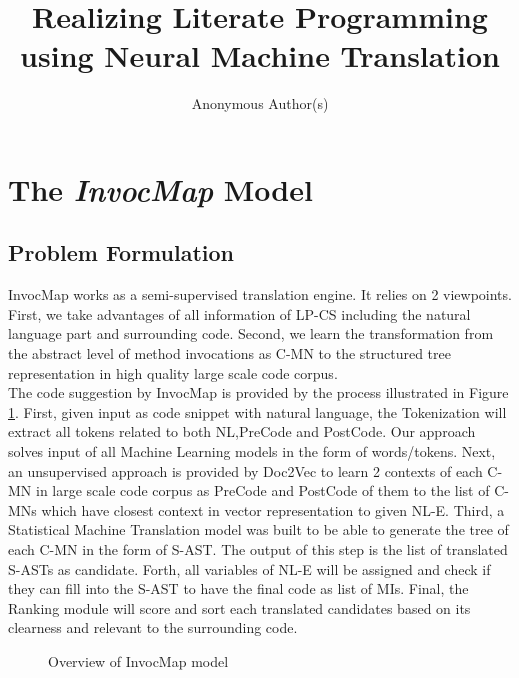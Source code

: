 \documentclass[sigconf,review,anonymous]{article}
\title{Realizing Literate Programming using Neural Machine Translation}
\author{%
  Anonymous Author(s)
}
\begin{document}
\maketitle







\section{The \textit{InvocMap} Model}
\subsection{Problem Formulation}
InvocMap works as a semi-supervised translation engine. It relies on 2 viewpoints. First, we take advantages of all information of LP-CS including the natural language part and surrounding code. Second, we learn the transformation from the abstract level of method invocations as C-MN to the structured tree representation in high quality large scale code corpus. 
\\
The code suggestion by InvocMap is provided by the process illustrated in Figure \ref{figOverview}. First, given input as code snippet with natural language, the Tokenization will extract all tokens related to both NL,PreCode and PostCode. Our approach solves input of all Machine Learning models in the form of words/tokens. Next, an unsupervised approach is provided by Doc2Vec \cite{002} to learn 2 contexts of each C-MN in large scale code corpus as PreCode and PostCode of them to the list of C-MNs which have closest context in vector representation to given NL-E. Third, a Statistical Machine Translation model was built to be able to generate the tree of each C-MN in the form of S-AST. The output of this step is the list of translated S-ASTs as candidate. Forth, all variables of NL-E will be assigned and check if they can fill into the S-AST to have the final code as list of MIs. Final, the Ranking module will score and sort each translated candidates based on its clearness and relevant to the surrounding code.  
\begin{figure}
   
        \caption{Overview of InvocMap model}
        \label{figOverview} 
\end{figure}
\end{document}

